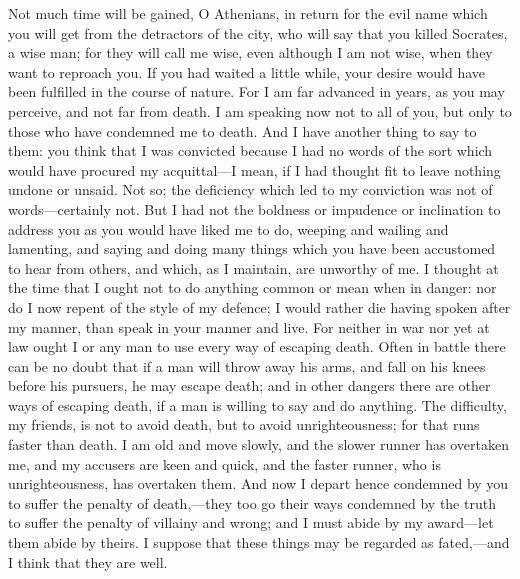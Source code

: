 \documentclass[11pt,letter]{article}
\begin{document}
\par  Not much time will be gained, O Athenians, in return for the evil name which you will get from the detractors of the city, who will say that you killed Socrates, a wise man; for they will call me wise, even although I am not wise, when they want to reproach you. If you had waited a little while, your desire would have been fulfilled in the course of nature. For I am far advanced in years, as you may perceive, and not far from death. I am speaking now not to all of you, but only to those who have condemned me to death. And I have another thing to say to them: you think that I was convicted because I had no words of the sort which would have procured my acquittal—I mean, if I had thought fit to leave nothing undone or unsaid. Not so; the deficiency which led to my conviction was not of words—certainly not. But I had not the boldness or impudence or inclination to address you as you would have liked me to do, weeping and wailing and lamenting, and saying and doing many things which you have been accustomed to hear from others, and which, as I maintain, are unworthy of me. I thought at the time that I ought not to do anything common or mean when in danger: nor do I now repent of the style of my defence; I would rather die having spoken after my manner, than speak in your manner and live. For neither in war nor yet at law ought I or any man to use every way of escaping death. Often in battle there can be no doubt that if a man will throw away his arms, and fall on his knees before his pursuers, he may escape death; and in other dangers there are other ways of escaping death, if a man is willing to say and do anything. The difficulty, my friends, is not to avoid death, but to avoid unrighteousness; for that runs faster than death. I am old and move slowly, and the slower runner has overtaken me, and my accusers are keen and quick, and the faster runner, who is unrighteousness, has overtaken them. And now I depart hence condemned by you to suffer the penalty of death,—they too go their ways condemned by the truth to suffer the penalty of villainy and wrong; and I must abide by my award—let them abide by theirs. I suppose that these things may be regarded as fated,—and I think that they are well.
\end{document}
